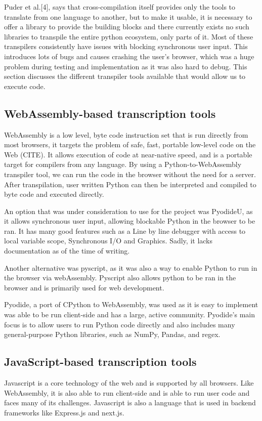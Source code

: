 Puder et al.[4], says that cross-compilation itself provides only the tools to translate from one language to another, but to make it usable, it is necessary to offer a library to provide the building blocks and there currently exists no such libraries to transpile the entire python ecosystem, only parts of it. Most of these transpilers consistently have issues with blocking synchronous user input. This introduces lots of bugs and causes crashing the user's browser, which was a huge problem during testing and implementation as it was also hard to debug. This section discusses the different transpiler tools available that would allow us to execute code.

\subsection{WebAssembly-based transcription tools}
WebAssembly is a low level, byte code instruction set that is run directly from most browsers, it targets the problem of safe, fast, portable low-level code on the Web (CITE). It allows execution of code at near-native speed, and is a portable target for compilers from any language. By using a Python-to-WebAssembly transpiler tool, we can run the code in the browser without the need for a server. After transpilation, user written Python can then be interpreted and compiled to byte code and executed directly.

An option that was under consideration to use for the project was PyodideU, as it allows synchronous user input, allowing blockable Python in the browser to be ran. It has many good features such as a Line by line debugger with access to local variable scope, Synchronous I/O and Graphics. Sadly, it lacks documentation as of the time of writing.

Another alternative was pyscript, as it was also a way to enable Python to run in the browser via webAssembly. Pyscript also allows python to be ran in the browser and is primarily used for web development.

Pyodide, a port of CPython to WebAssembly, was used as it is easy to implement was able to be run client-side and has a large, active community. Pyodide's main focus is to allow users to run Python code directly and also includes many general-purpose Python libraries, such as NumPy, Pandas, and regex.

\subsection{JavaScript-based transcription tools}
Javascript is a core technology of the web and is supported by all browsers. Like WebAssembly, it is also able to run client-side and is able to run user code and faces many of its challenges. Javascript is also a language that is used in backend frameworks like Express.js and next.js.

